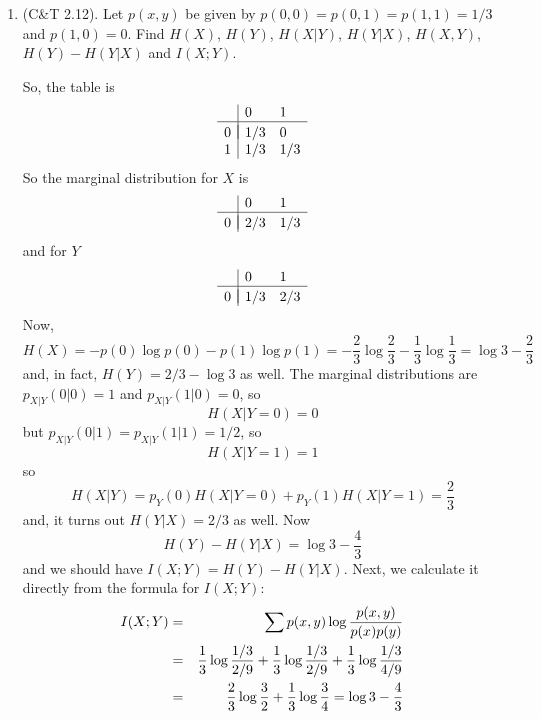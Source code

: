 \documentclass[12pt]{article}
\begin{document}
\begin{enumerate}
\item (C\&T 2.12). Let $p(x,y)$ be given by $p(0,0)=p(0,1)=p(1,1)=1/3$
  and $p(1,0)=0$. Find $H(X)$, $H(Y)$, $H(X|Y)$, $H(Y|X)$, $H(X,Y)$,
  $H(Y)-H(Y|X)$ and $I(X;Y)$.


\soln{} So, the table is
\begin{equation}
\begin{array}{l|ll}
&0&1\\
\hline\\[-10pt]
0&1/3&0\\
1&1/3&1/3
\end{array}
\end{equation}     
So the marginal distribution for $X$ is 
\begin{equation}
\begin{array}{l|ll}
&0&1\\
\hline\\[-10pt]
0&2/3&1/3
\end{array}
\end{equation}     
and for $Y$
\begin{equation}
\begin{array}{l|ll}
&0&1\\
\hline\\[-10pt]
0&1/3&2/3
\end{array}
\end{equation}     
Now, 
\begin{equation}
H(X)=-p(0)\log{p(0)}-p(1)\log{p(1)}=-\frac{2}{3}\log{\frac{2}{3}}-\frac{1}{3}\log{\frac{1}{3}}=\log{3}-\frac{2}{3}
\end{equation}
and, in fact, $H(Y)=2/3-\log{3}$ as well. The marginal distributions are $p_{X|Y}(0|0)=1$ and $p_{X|Y}(1|0)=0$, so
\begin{equation}
H(X|Y=0)=0
\end{equation}
but $p_{X|Y}(0|1)=p_{X|Y}(1|1)=1/2$, so
\begin{equation}
H(X|Y=1)=1
\end{equation}
so 
\begin{equation}
H(X|Y)=p_Y(0)H(X|Y=0)+p_Y(1)H(X|Y=1)=\frac{2}{3}
\end{equation}
and, it turns out $H(Y|X)=2/3$ as well. Now
\begin{equation}
H(Y)-H(Y|X)=\log{3}-\frac{4}{3}
\end{equation}
and we should have $I(X;Y)=H(Y)-H(Y|X)$. Next, we calculate it directly from the formula for $I(X;Y)$:
\begin{eqnarray}
I(X;Y)&=&\sum p(x,y)\log{\frac{p(x,y)}{p(x)p(y)}}\cr
&=&\frac{1}{3}\log{\frac{1/3}{2/9}}+\frac{1}{3}\log{\frac{1/3}{2/9}}+\frac{1}{3}\log{\frac{1/3}{4/9}}\cr
&=&\frac{2}{3}\log{\frac{3}{2}}+\frac{1}{3}\log{\frac{3}{4}}=\log{3}-\frac{4}{3}
\end{eqnarray}



\end{enumerate}
\end{document}
